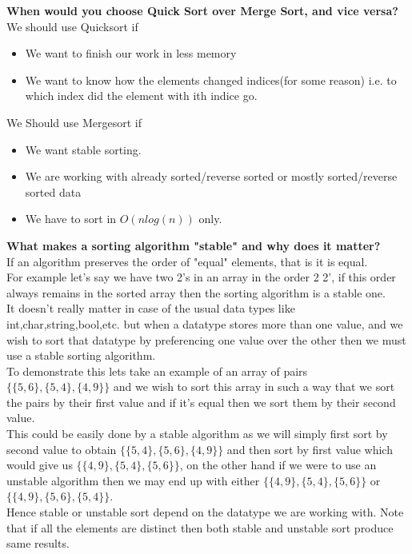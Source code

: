 \documentclass{article}
\begin{document}
\noindent \textbf{When would you choose Quick Sort over Merge Sort, and vice versa?}\\
We should use Quicksort if
\begin{itemize}
    \item We want to finish our work in less memory
    \item We want to know how the elements changed indices(for some reason) i.e. to which index did the element with ith indice go.
\end{itemize}
We Should use Mergesort if
\begin{itemize}
    \item We want stable sorting.
    \item We are working with already sorted/reverse sorted or mostly sorted/reverse sorted data
    \item We have to sort in $O(nlog(n))$ only.
\end{itemize}
\vspace{15pt}
\textbf{What makes a sorting algorithm "stable" and why does it matter?}
\\
If an algorithm preserves the order of "equal" elements, that is it is equal.\\
For example let's say we have two 2's in an array in the order 2 2', if this order always remains in the sorted array then the sorting algorithm is a stable one.\\
It doesn't really matter in case of the usual data types like int,char,string,bool,etc. but when a datatype stores more than one value, and we wish to sort that datatype by preferencing one value over the other then we must use a stable sorting algorithm.\\
To demonstrate this lets take an example of an array of pairs $\{\{5,6\},\{5,4\},\{4,9\}\}$ and we wish to sort this array in such a way that we sort the pairs by their first value and if it's equal then we sort them by their second value.\\
This could be easily done by a stable algorithm as we will simply first sort by second value to obtain $\{\{5,4\},\{5,6\},\{4,9\}\}$ and then sort by first value which would give us $\{\{4,9\},\{5,4\},\{5,6\}\}$, on the other hand if we were to use an unstable algorithm then we may end up with either $\{\{4,9\},\{5,4\},\{5,6\}\}$ or $\{\{4,9\},\{5,6\},\{5,4\}\}$.\\
Hence stable or unstable sort depend on the datatype we are working with. Note that if all the elements are distinct then both stable and unstable sort produce same results.
\end{document}
